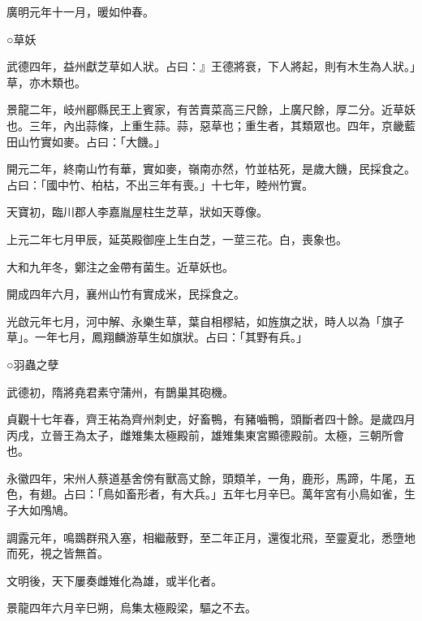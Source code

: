 \begin{pinyinscope}
 廣明元年十一月，暖如仲春。



 ○草妖



 武德四年，益州獻芝草如人狀。占曰：』王德將衰，下人將起，則有木生為人狀。」草，亦木類也。



 景龍二年，岐州郿縣民王上賓家，有苦賣菜高三尺餘，上廣尺餘，厚二分。近草妖也。三年，內出蒜條，上重生蒜。蒜，惡草也；重生者，其類眾也。四年，京畿藍田山竹實如麥。占曰：「大饑。」



 開元二年，終南山竹有華，實如麥，嶺南亦然，竹並枯死，是歲大饑，民採食之。占曰：「國中竹、柏枯，不出三年有喪。」十七年，睦州竹實。



 天寶初，臨川郡人李嘉胤屋柱生芝草，狀如天尊像。



 上元二年七月甲辰，延英殿御座上生白芝，一莖三花。白，喪象也。



 大和九年冬，鄭注之金帶有菌生。近草妖也。



 開成四年六月，襄州山竹有實成米，民採食之。



 光啟元年七月，河中解、永樂生草，葉自相樛結，如旌旗之狀，時人以為「旗子草」。一年七月，鳳翔麟游草生如旗狀。占曰：「其野有兵。」



 ○羽蟲之孽



 武德初，隋將堯君素守蒲州，有鵲巢其砲機。



 貞觀十七年春，齊王祐為齊州刺史，好畜鴨，有豬嚙鴨，頭斷者四十餘。是歲四月丙戌，立晉王為太子，雌雉集太極殿前，雄雉集東宮顯德殿前。太極，三朝所會也。



 永徽四年，宋州人蔡道基舍傍有獸高丈餘，頭類羊，一角，鹿形，馬蹄，牛尾，五色，有翅。占曰：「鳥如畜形者，有大兵。」五年七月辛巳。萬年宮有小鳥如雀，生子大如鳲鳩。



 調露元年，鳴鵽群飛入塞，相繼蔽野，至二年正月，還復北飛，至靈夏北，悉墮地而死，視之皆無首。



 文明後，天下屢奏雌雉化為雄，或半化者。



 景龍四年六月辛巳朔，烏集太極殿梁，驅之不去。




\end{pinyinscope}
